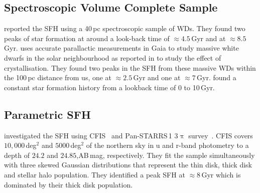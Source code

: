 \documentclass[fleqn,usenatbib]{mnras}
\begin{document}
\subsection{Spectroscopic Volume Complete Sample}
\citet[][hereafter, T14]{2014ApJ...791...92T} reported the SFH using a 40\,pc spectroscopic sample
of WDs. They found two peaks of star formation at around a look-back time of
$\approx4.5$\,Gyr and at $\approx8.5$\,Gyr. \citet{2019ApJ...878L..11I}
uses accurate parallactic measurements in Gaia to study massive white dwarfs in
the solar neighbourhood as reported in \citet{2019Natur.565..202T} to study the
effect of crystallisation. They found two peaks in the SFH from these massive
WDs within the 100\,pc distance from us, one at $\approx2.5$\,Gyr and one at
$\approx7$\,Gyr. \citet[][hereafter, C23]{2023MNRAS.522.1643C} found a constant star formation
history from a lookback time of 0 to 10\,Gyr.

\subsection{Parametric SFH}
\citet{2019ApJ...887..148F} investigated the SFH using
CFIS~\citep{2017ApJ...848..128I} and Pan-STARRS\,1 3$\uppi$
survey~\citep{2016arXiv161205560C}. CFIS covers $10,000$\,deg$^2$ and
$5000$\,deg$^2$ of the northern sky in u and r-band photometry to a depth of
$24.2$ and $24.85$,AB\,mag, respectively. They fit the sample simultaneously
with three skewed Gaussian distributions that represent the thin disk, thick
disk and stellar halo population. They identified a peak SFH at $\approx8$\,Gyr
which is dominated by their thick disk population.

\end{document}
